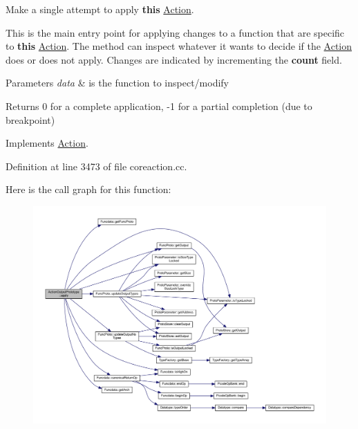 Make a single attempt to apply {\bfseries{this}} \mbox{\hyperlink{class_action}{Action}}. 

This is the main entry point for applying changes to a function that are specific to {\bfseries{this}} \mbox{\hyperlink{class_action}{Action}}. The method can inspect whatever it wants to decide if the \mbox{\hyperlink{class_action}{Action}} does or does not apply. Changes are indicated by incrementing the {\bfseries{count}} field. 
\begin{DoxyParams}{Parameters}
{\em data} & is the function to inspect/modify \\
\hline
\end{DoxyParams}
\begin{DoxyReturn}{Returns}
0 for a complete application, -\/1 for a partial completion (due to breakpoint) 
\end{DoxyReturn}


Implements \mbox{\hyperlink{class_action_aac1c3999d6c685b15f5d9765a4d04173}{Action}}.



Definition at line 3473 of file coreaction.\+cc.

Here is the call graph for this function\+:
\nopagebreak
\begin{figure}[H]
\begin{center}
\leavevmode
\includegraphics[width=350pt]{class_action_output_prototype_a1ed1275253a29c1d09d2383c00e34a9c_cgraph}
\end{center}
\end{figure}
\mbox{\label{class_action_output_prototype_abaa0684e2d727f785d3e45e091da5dd1}} 
